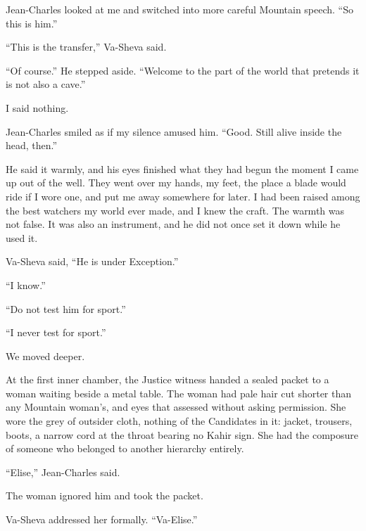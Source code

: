 Jean-Charles looked at me and switched into more careful Mountain speech. ``So this is him.''\par

``This is the transfer,'' Va-Sheva said.\par

``Of course.'' He stepped aside. ``Welcome to the part of the world that pretends it is not also a cave.''\par

I said nothing.\par

Jean-Charles smiled as if my silence amused him. ``Good. Still alive inside the head, then.''\par

He said it warmly, and his eyes finished what they had begun the moment I came up out of the well. They went over my hands, my feet, the place a blade would ride if I wore one, and put me away somewhere for later. I had been raised among the best watchers my world ever made, and I knew the craft. The warmth was not false. It was also an instrument, and he did not once set it down while he used it.\par

Va-Sheva said, ``He is under Exception.''\par

``I know.''\par

``Do not test him for sport.''\par

``I never test for sport.''\par

We moved deeper.\par

At the first inner chamber, the Justice witness handed a sealed packet to a woman waiting beside a metal table. The woman had pale hair cut shorter than any Mountain woman's, and eyes that assessed without asking permission. She wore the grey of outsider cloth, nothing of the Candidates in it: jacket, trousers, boots, a narrow cord at the throat bearing no Kahir sign. She had the composure of someone who belonged to another hierarchy entirely.\par

``Elise,'' Jean-Charles said.\par

The woman ignored him and took the packet.\par

Va-Sheva addressed her formally. ``Va-Elise.''\par

